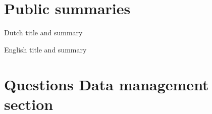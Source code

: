 \documentclass[a4paper,10pt,fleqn]{application}
\begin{document}
\section{Public summaries} %

Dutch title and summary

English title and summary

\section{Questions Data management section}



\end{document}
